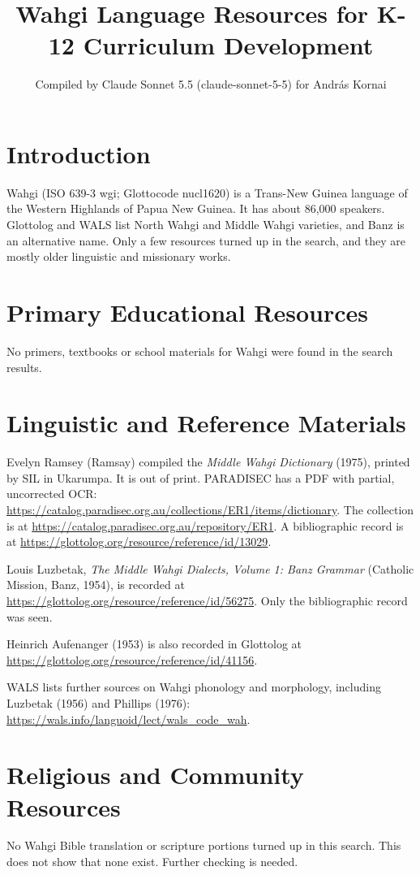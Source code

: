 \documentclass[12pt]{article}
\title{Wahgi Language Resources for K-12 Curriculum Development}
\author{Compiled by Claude Sonnet 5.5 (claude-sonnet-5-5) for Andr\'as Kornai}
\date{}
\begin{document}
\maketitle

\section{Introduction}
Wahgi (ISO 639-3 wgi; Glottocode nucl1620) is a Trans-New Guinea language of the Western Highlands of Papua New Guinea. It has about 86,000 speakers. Glottolog and WALS list North Wahgi and Middle Wahgi varieties, and Banz is an alternative name. Only a few resources turned up in the search, and they are mostly older linguistic and missionary works.

\section{Primary Educational Resources}
No primers, textbooks or school materials for Wahgi were found in the search results.

\section{Linguistic and Reference Materials}
Evelyn Ramsey (Ramsay) compiled the \emph{Middle Wahgi Dictionary} (1975), printed by SIL in Ukarumpa. It is out of print. PARADISEC has a PDF with partial, uncorrected OCR: \url{https://catalog.paradisec.org.au/collections/ER1/items/dictionary}. The collection is at \url{https://catalog.paradisec.org.au/repository/ER1}. A bibliographic record is at \url{https://glottolog.org/resource/reference/id/13029}.

Louis Luzbetak, \emph{The Middle Wahgi Dialects, Volume 1: Banz Grammar} (Catholic Mission, Banz, 1954), is recorded at \url{https://glottolog.org/resource/reference/id/56275}. Only the bibliographic record was seen.

Heinrich Aufenanger (1953) is also recorded in Glottolog at \url{https://glottolog.org/resource/reference/id/41156}.

WALS lists further sources on Wahgi phonology and morphology, including Luzbetak (1956) and Phillips (1976): \url{https://wals.info/languoid/lect/wals_code_wah}.

\section{Religious and Community Resources}
No Wahgi Bible translation or scripture portions turned up in this search. This does not show that none exist. Further checking is needed.
\end{document}
